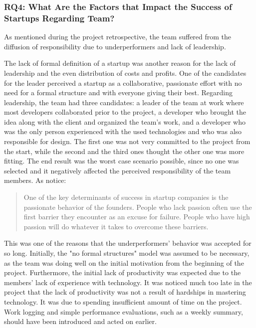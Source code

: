 \documentclass{article}
\begin{document}
\subsubsection{RQ4: What Are the Factors that Impact the Success of Startups Regarding Team?}
As mentioned during the project retrospective, the team suffered from the diffusion of responsibility due to underperformers and lack of leadership.


The lack of formal definition of a startup \citep{paternoster2014software} was another reason for the lack of leadership and the even distribution of costs and profits. One of the candidates for the leader perceived a startup as a collaborative, passionate effort with no need for a formal structure and with everyone giving their best. 
Regarding leadership, the team had three candidates: a leader of the team at work where most developers collaborated prior to the project, a developer who brought the idea along with the client and organized the team's work, and a developer who was the only person experienced with the used technologies and who was also responsible for design. The first one was not very committed to the project from the start, while the second and the third ones thought the other one was more fitting. The end result was the worst case scenario possible, since no one was selected and it negatively affected the perceived responsibility of the team members.
As \citet[39]{giardino2014early} notice:
\begin{quote}
  One of the key determinants of success in startup companies is the passionate behavior of the founders. People who lack passion often use the first barrier they encounter as an excuse for failure. People who have high passion will do whatever it takes to overcome these barriers.
\end{quote}

This was one of the reasons that the underperformers' behavior was accepted for so long. Initially, the "no formal structures" model was assumed to be necessary, as the team was doing well on the initial motivation from the beginning of the project. Furthermore, the initial lack of productivity was expected due to the members' lack of experience with technology. It was noticed much too late in the project that the lack of productivity was not a result of hardships in mastering technology. It was due to spending insufficient amount of time on the project. Work logging and simple performance evaluations, such as a weekly summary, should have been introduced and acted on earlier.
\end{document}
